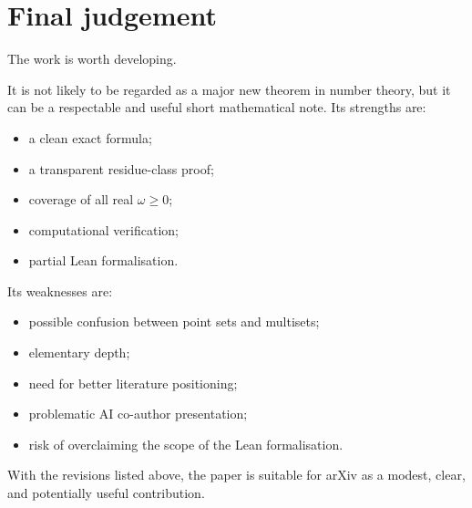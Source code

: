 \documentclass[11pt]{article}
\begin{document}
\section*{Final judgement}

The work is worth developing.

It is not likely to be regarded as a major new theorem in number theory, but
it can be a respectable and useful short mathematical note.  Its strengths are:

\begin{itemize}
    \item a clean exact formula;
    \item a transparent residue-class proof;
    \item coverage of all real \(\omega\ge0\);
    \item computational verification;
    \item partial Lean formalisation.
\end{itemize}

Its weaknesses are:

\begin{itemize}
    \item possible confusion between point sets and multisets;
    \item elementary depth;
    \item need for better literature positioning;
    \item problematic AI co-author presentation;
    \item risk of overclaiming the scope of the Lean formalisation.
\end{itemize}

With the revisions listed above, the paper is suitable for arXiv as a modest,
clear, and potentially useful contribution.
\end{document}
